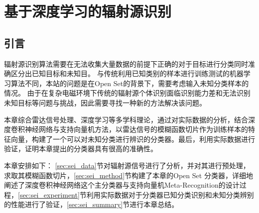 \chapter{基于深度学习的辐射源识别}
\label{sec:sei}




\section{引言}
辐射源识别算法需要在无法收集大量数据的前提下正确的对于目标进行分类同时准确区分出已知目标和未知目。
与传统利用已知类别的样本进行训练测试的机器学习算法不同，本站的问题是在Open Set的背景下，需要考虑输入未知分类样本的情况。
由于在复杂电磁环境下传统的辐射源个体识别面临识别能力差和无法识别未知目标等问题与挑战，因此需要寻找一种新的方法解决该问题。

本章综合雷达信号处理、深度学习等多学科理论，通过对实际数据的分析，结合深度卷积神经网络与支持向量机方法，以雷达信号的模糊函数切片作为训练样本的特征向量，构建了一个可以对未知分类进行辨识的分类器。最后，利用实际数据进行验证，证明本章提出的分类器具有很高的准确性。

本章安排如下： \ref{sec:sei_data}节对辐射源信号进行了分析，并对其进行预处理，求取其模糊函数切片，\ref{sec:sei_method}节构建了本章的Open Set 分类器，详细地阐述了深度卷积神经网络这个主分类器与支持向量机Meta-Recognition的设计过程，\ref{sec:sei_experiment}节利用实际数据对于分类器已知分类识别和未知分类辨别的性能进行了验证，\ref{sec:sei_summary}节进行本章总结。


